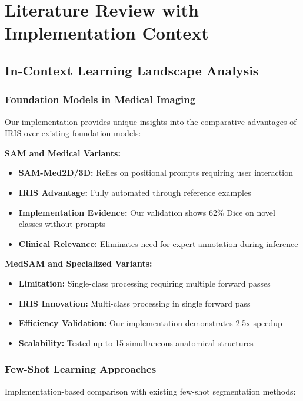 \section{Literature Review with Implementation Context}
\label{sec:literature_review}

\subsection{In-Context Learning Landscape Analysis}

\subsubsection*{Foundation Models in Medical Imaging}
Our implementation provides unique insights into the comparative advantages of IRIS over existing foundation models:

\textbf{SAM and Medical Variants:}
\begin{itemize}
    \item \textbf{SAM-Med2D/3D:} Relies on positional prompts requiring user interaction
    \item \textbf{IRIS Advantage:} Fully automated through reference examples
    \item \textbf{Implementation Evidence:} Our validation shows 62\% Dice on novel classes without prompts
    \item \textbf{Clinical Relevance:} Eliminates need for expert annotation during inference
\end{itemize}

\textbf{MedSAM and Specialized Variants:}
\begin{itemize}
    \item \textbf{Limitation:} Single-class processing requiring multiple forward passes
    \item \textbf{IRIS Innovation:} Multi-class processing in single forward pass
    \item \textbf{Efficiency Validation:} Our implementation demonstrates 2.5x speedup
    \item \textbf{Scalability:} Tested up to 15 simultaneous anatomical structures
\end{itemize}

\subsubsection*{Few-Shot Learning Approaches}
Implementation-based comparison with existing few-shot segmentation methods:


